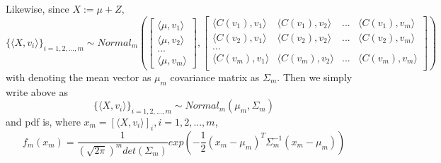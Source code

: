 \documentclass{article}
\begin{document}
Likewise, since $X:=\mu+Z$,
\[\{\langle X, v_i\rangle\}_{i=1,2,...,m} \sim Normal_m(
\begin{bmatrix}
    \langle \mu,v_1 \rangle \\
    \langle \mu,v_2 \rangle \\
    ... \\
    \langle \mu,v_m \rangle
\end{bmatrix}
,
\begin{bmatrix}
    \langle C(v_1),v_1 \rangle & \langle C(v_1),v_2 \rangle & ... & \langle C(v_1),v_m \rangle \\
    \langle C(v_2),v_1 \rangle & \langle C(v_2),v_2 \rangle & ... & \langle C(v_2),v_m \rangle \\
    ... \\
    \langle C(v_m),v_1 \rangle & \langle C(v_m),v_2 \rangle & ... & \langle C(v_m),v_m \rangle \\
\end{bmatrix}
)\]
with denoting the mean vector as $\mu_m$ covariance matrix as $\Sigma_m$. Then we simply write above as
\[\{\langle X, v_i\rangle\}_{i=1,2,...,m} \sim Normal_m(\mu_m,\Sigma_m)\]
and pdf is, where \(x_m=[\langle X, v_i\rangle]_i, i=1,2,...,m\),
\[
    f_m(x_m) = \frac{1}{(\sqrt{2\pi})^m det(\Sigma_m)}exp{(-\frac{1}{2}(x_m-\mu_m)^T\Sigma_m^{-1}(x_m-\mu_m))}
\]
\end{document}
